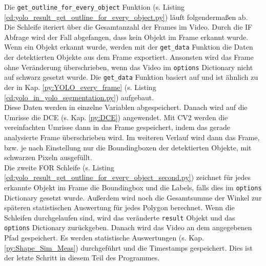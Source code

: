 {	Die \lstinline|get_outline_for_every_object| Funktion \ifimportant (s. Listing \ref{cd:yolo_result_get_outline_for_every_object.py}) \fi läuft folgendermaßen ab. \\
	Die Schleife iteriert über die Gesamtanzahl der Frames im Video. Durch die IF Abfrage wird der Fall abgefangen, dass kein Objekt im Frame erkannt wurde. Wenn ein Objekt erkannt wurde, werden mit der \lstinline|get_data| Funktion die Daten der detektierten Objekte aus dem Frame exportiert. Ansonsten wird das Frame ohne Veränderung überschrieben, wenn das Video im \lstinline|options| Dictionary nicht auf schwarz gesetzt wurde. Die \lstinline|get_data| Funktion basiert auf \citeauthor{Canu_pysource} \citep{Canu_pysource} und ist ähnlich zu der in Kap. \ref{py:YOLO_every_frame} \ifimportant (s. Listing \ref{cd:yolo_in_yolo_segmentation.py}) \fi aufgebaut. \\
	Diese Daten werden in einzelne Variablen abgespeichert. Danach wird auf die Umrisse die DCE (s. Kap. \ref{py:DCE}) angewendet. Mit CV2 werden die vereinfachten Umrisse dann in das Frame gespeichert, indem das gerade analysierte Frame überschrieben wird. Im weiteren Verlauf wird dann das Frame, bzw. je nach Einstellung nur die Boundingboxen der detektierten Objekte, mit schwarzen Pixeln ausgefüllt. \\
	\ifimportant
	\fi Die zweite FOR Schleife \ifimportant (s. Listing \ref{cd:yolo_result_get_outline_for_every_object_second.py}) \fi zeichnet für jedes erkannte Objekt im Frame die Boundingbox und die Labels, falls dies im \lstinline|options| Dictionary gesetzt wurde. Außerdem wird noch die Gesamtsumme der Winkel  zur späteren statistischen Auswertung für jedes Polygon berechnet.
	\ifimportant
	\fi Wenn die Schleifen durchgelaufen sind, wird das veränderte \lstinline|result| Objekt und das \lstinline|options| Dictionary zurückgeben. Danach wird das Video an dem angegebenen Pfad gespeichert. Es werden statistische Auswertungen (s. Kap. \ref{py:Shape_Sim_Meas}) durchgeführt und die Timestamps gespeichert. Dies ist der letzte Schritt in diesem Teil des  Programmes. \\
	}

